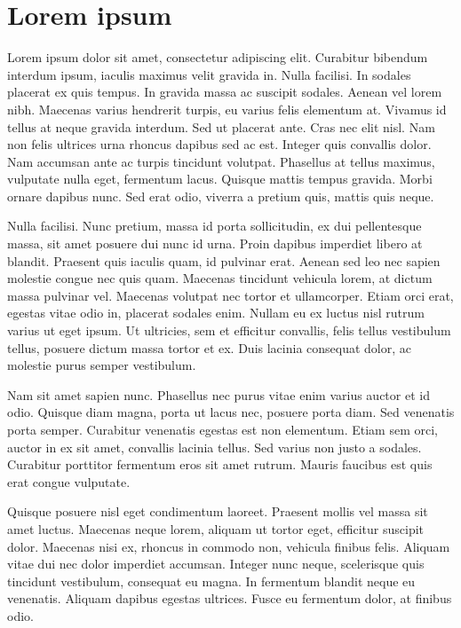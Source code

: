 \section{Lorem ipsum}

Lorem ipsum dolor sit amet, consectetur adipiscing elit. Curabitur bibendum interdum ipsum, iaculis maximus velit gravida in. Nulla facilisi. In sodales placerat ex quis tempus. In gravida massa ac suscipit sodales. Aenean vel lorem nibh. Maecenas varius hendrerit turpis, eu varius felis elementum at. Vivamus id tellus at neque gravida interdum. Sed ut placerat ante. Cras nec elit nisl. Nam non felis ultrices urna rhoncus dapibus sed ac est. Integer quis convallis dolor. Nam accumsan ante ac turpis tincidunt volutpat. Phasellus at tellus maximus, vulputate nulla eget, fermentum lacus. Quisque mattis tempus gravida. Morbi ornare dapibus nunc. Sed erat odio, viverra a pretium quis, mattis quis neque.

Nulla facilisi. Nunc pretium, massa id porta sollicitudin, ex dui pellentesque massa, sit amet posuere dui nunc id urna. Proin dapibus imperdiet libero at blandit. Praesent quis iaculis quam, id pulvinar erat. Aenean sed leo nec sapien molestie congue nec quis quam. Maecenas tincidunt vehicula lorem, at dictum massa pulvinar vel. Maecenas volutpat nec tortor et ullamcorper. Etiam orci erat, egestas vitae odio in, placerat sodales enim. Nullam eu ex luctus nisl rutrum varius ut eget ipsum. Ut ultricies, sem et efficitur convallis, felis tellus vestibulum tellus, posuere dictum massa tortor et ex. Duis lacinia consequat dolor, ac molestie purus semper vestibulum.

Nam sit amet sapien nunc. Phasellus nec purus vitae enim varius auctor et id odio. Quisque diam magna, porta ut lacus nec, posuere porta diam. Sed venenatis porta semper. Curabitur venenatis egestas est non elementum. Etiam sem orci, auctor in ex sit amet, convallis lacinia tellus. Sed varius non justo a sodales. Curabitur porttitor fermentum eros sit amet rutrum. Mauris faucibus est quis erat congue vulputate.

Quisque posuere nisl eget condimentum laoreet. Praesent mollis vel massa sit amet luctus. Maecenas neque lorem, aliquam ut tortor eget, efficitur suscipit dolor. Maecenas nisi ex, rhoncus in commodo non, vehicula finibus felis. Aliquam vitae dui nec dolor imperdiet accumsan. Integer nunc neque, scelerisque quis tincidunt vestibulum, consequat eu magna. In fermentum blandit neque eu venenatis. Aliquam dapibus egestas ultrices. Fusce eu fermentum dolor, at finibus odio.

